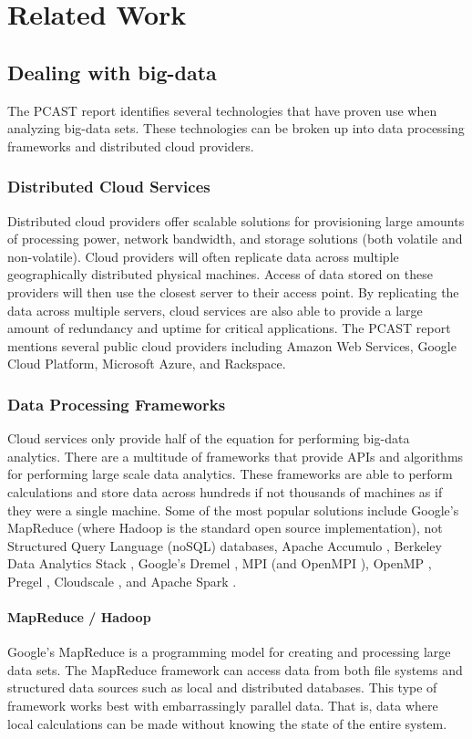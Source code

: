\chapter{Related Work}
\section{Dealing with big-data}
The PCAST report identifies several technologies that have proven use when analyzing big-data sets. These technologies can be broken up into data processing frameworks and distributed cloud providers.

\subsection{Distributed Cloud Services}
Distributed cloud providers offer scalable solutions for provisioning large amounts of processing power, network bandwidth, and storage solutions (both volatile and non-volatile). Cloud providers will often replicate data across multiple geographically distributed physical machines. Access of data stored on these providers will then use the closest server to their access point. By replicating the data across multiple servers, cloud services are also able to provide a large amount of redundancy and uptime for critical applications. The PCAST report mentions several public cloud providers including Amazon Web Services, Google Cloud Platform, Microsoft Azure, and Rackspace.

\subsection{Data Processing Frameworks}
Cloud services only provide half of the equation for performing big-data analytics. There are a multitude of frameworks that provide APIs and algorithms for performing large scale data analytics. These frameworks are able to perform calculations and store data across hundreds if not thousands of machines as if they were a single machine. Some of the most popular solutions include Google's MapReduce (where Hadoop \cite{hadoop} is the standard open source implementation), not Structured Query Language (noSQL) databases, Apache Accumulo \cite{accumulo}, Berkeley Data Analytics Stack \cite{bdas}, Google's Dremel \cite{dremel}, MPI \cite{mpi} (and OpenMPI \cite{openmpi}), OpenMP \cite{openmp}, Pregel \cite{malewicz_pregel:_2010}, Cloudscale \cite{shen_cloudscale}, and Apache Spark \cite{spark}.

\subsubsection{MapReduce / Hadoop}
Google's MapReduce is a programming model for creating and processing large data sets. The MapReduce framework can access data from both file systems and structured data sources such as local and distributed databases. This type of framework works best with embarrassingly parallel data. That is, data where local calculations can be made without knowing the state of the entire system.

